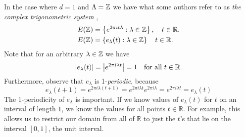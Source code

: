 \documentclass[../thesis.tex]{subfiles}
\begin{document}
\begin{example}
    In the case where $d=1$ and $\Lambda = \mathbb{Z}$ we have what some authors refer to as \emph{the complex trigonometric system} \cite{heilMetricsNormsInner2018} \cite{encyclopediaofmathematicsTrigonometricSystem},
    \begin{align}
        E(\mathbb{Z}) &= \left\{e^{2\pi i t \lambda} : \lambda \in \mathbb{Z}\right\}, \quad t\in \mathbb{R}.\\
        E(\mathbb{Z}) &= \left\{e_\lambda(t) : \lambda \in \mathbb{Z}\right\}\quad t\in \mathbb{R}.
    \end{align}
    Note that for an arbitrary $\lambda \in \mathbb{Z}$ we have
    \begin{equation}
        \left|e_{\lambda}(t) \right|= \left|e^{2 \pi i \lambda t}\right| = 1 \quad \text{for all } t\in \mathbb{R}.
    \end{equation}
    Furthermore, observe that $e_\lambda$ is 1-\emph{periodic}, because
    \begin{equation}
        e_\lambda(t+1) = e^{2 \pi i \lambda (t+1)} = e^{2 \pi i \lambda t} e^{2 \pi i \lambda} = e^{2 \pi i \lambda t} = e_\lambda(t)
    \end{equation}
    The 1-periodicity of $e_\lambda$ is important. If we know values of $e_\lambda(t)$ for $t$ on an interval of length $1$, we know the values for all points $t\in \mathbb{R}$. For example, this allows us to restrict our domain from all of $\mathbb{R}$ to just the $t$'s that lie on the interval $[0,1]$, the unit interval. 
\end{example}

\end{document}
